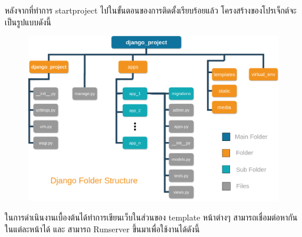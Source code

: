 \newpage
หลังจากที่ทำการ startproject ไปในขั้นตอนของการติดตั้งเรียบร้อยแล้ว โครงสร้างของโปรเจ็กต์จะเป็นรูปแบบดังนี้

\begin{figure}[!thb]
	\captionsetup{justification=centering}
	\centering
	\includegraphics[width=6in]{figures/djangoproject.png}
	\label{fig:djangoproject}
\end{figure}
\newpage

ในการดำเนินงานเบื้องต้นได้ทำการเขียนเว็บในส่วนของ template หน้าต่างๆ  สามารถเชื่อมต่อหากันในแต่ละหน้าได้ และ สามารถ Runserver ขึ้นมาเพื่อใช้งานได้ดังนี้

